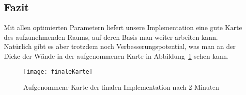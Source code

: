 \subsection{Fazit}

Mit allen optimierten Parametern liefert unsere Implementation eine gute Karte des aufzunehmenden Raums, auf deren Basis man weiter arbeiten kann. Natürlich gibt es aber trotzdem noch Verbesserungspotential, was man an der Dicke der Wände in der aufgenommenen Karte in Abbildung~\ref{fig:finaleKarte} sehen kann.

\begin{figure}
	\centering
	\texttt{[image: finaleKarte]}
	\caption{Aufgenommene Karte der finalen Implementation nach 2 Minuten}
	\label{fig:finaleKarte}
\end{figure}